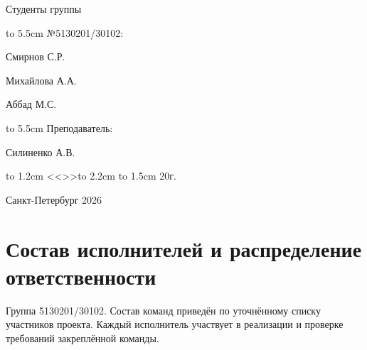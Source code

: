 \documentclass[12pt,a4paper,final]{article}
\begin{document}
	
	\begin{flushleft}
		Студенты группы
	\end{flushleft}
	\vspace{-0.55cm}
	\begin{flushleft}
		\hbox to 5.5cm {№5130201/30102:\quad \hrulefill}
	\end{flushleft}
	\begin{flushright}
		\vspace{-1.45cm}
		Смирнов С.Р.
	\end{flushright}
    \begin{flushright}
		
		Михайлова А.А.
	\end{flushright}
    \begin{flushright}
		
		Аббад М.С.
	\end{flushright}
	\vspace{1cm}
	\begin{flushleft}
		\hbox to 5.5cm {Преподаватель:\quad \hrulefill}
	\end{flushleft}
	\begin{flushright}
		\vspace{-1.5cm}
		Силиненко А.В.
	\end{flushright}
	\begin{flushright}
		\vspace{1cm}
		\hspace{5cm}\hbox to 1.2cm {<<\hrulefill>>}\hbox to 2.2cm {\hrulefill }\hbox to 1.5cm { 20\hrulefill г.}
	\end{flushright}
	\begin{center}
		\vspace{4cm}
		Санкт-Петербург 2026
	\end{center}
	\newpage
    \section*{Состав исполнителей и распределение ответственности}
 
\noindent Группа 5130201/30102. Состав команд приведён по уточнённому списку
участников проекта. Каждый исполнитель участвует в реализации и проверке
требований закреплённой команды.
 
\end{document}
